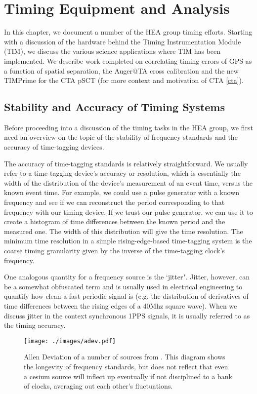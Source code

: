 
\chapter{Timing Equipment and Analysis}
\label{timtiming}
In this chapter, we document a number of the HEA group timing efforts. Starting with a discussion of the hardware behind the Timing Instrumentation Module (TIM), we discuss the various science applications where TIM has been implemented. We describe work completed on correlating timing errors of GPS as a function of spatial separation, the Auger@TA cross calibration and the new TIMPrime for the CTA pSCT (for more context and motivation of CTA \autoref{cta}).


\section{Stability and Accuracy of Timing Systems}
\label{stabacc}
Before proceeding into a discussion of the timing tasks in the HEA group, we first need an overview on the topic of the stability of frequency standards and the accuracy of time-tagging devices. 

The accuracy of time-tagging standards is relatively straightforward. We usually refer to a time-tagging device's accuracy or resolution, which is essentially the width of the distribution of the device's measurement of an event time, versus the known event time. For example, we could use a pulse generator with a known frequency and see if we can reconstruct the period corresponding to that frequency with our timing device. If we trust our pulse generator, we can use it to create a histogram of time differences between the known period and the measured one. The width of this distribution will give the time resolution. The minimum time resolution in a simple rising-edge-based time-tagging system is the coarse timing granularity given by the inverse of the time-tagging clock's frequency. 

One analogous quantity for a frequency source is the `jitter". Jitter, however, can be a somewhat obfuscated term and is usually used in electrical engineering to quantify how clean a fast periodic signal is (e.g. the distribution of derivatives of time differences between the rising edges of a 40Mhz square wave). When we discuss jitter in the context synchronous 1PPS signals, it is usually referred to as the timing accuracy.

\begin{figure}[h!]
\centering
\texttt{[image: ./images/adev.pdf]}
\caption[CSAC Allen Deviation]{Allen Deviation of a number of sources from \textcite{csac}. This diagram shows the longevity of frequency standards, but does not reflect that even a cesium source will inflect up eventually if not disciplined to a bank of clocks, averaging out each other's fluctuations.}
\label{adev}
\end{figure}

